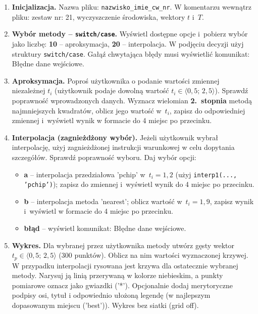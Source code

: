 \documentclass[a4paper,11pt]{article}
\begin{document}
\begin{enumerate}[leftmargin=*, label=\textbf{\arabic*.}, itemsep=2pt]

  \item \textbf{Inicjalizacja.}
    Nazwa pliku: \texttt{nazwisko\_imie\_cw\_nr}. W komentarzu wewnątrz pliku: zestaw nr: 21, wyczyszczenie środowiska, wektory $t$ i~$T$.

  \item \textbf{Wybór metody -- \texttt{switch/case}.}
    Wyświetl dostępne opcje i~pobierz wybór jako liczbę: \textbf{10} -- aproksymacja, \textbf{20} -- interpolacja. W podjęciu decyzji użyj struktury \texttt{switch/case}. Gałąź chwytająca błędy musi wyświetlić komunikat: Błędne dane wejściowe.

  \item \textbf{Aproksymacja.}
    Poproś użytkownika o podanie wartości zmiennej niezależnej $t_i$ (użytkownik podaje dowolną wartość $t_i \in \langle 0{,}5;\,2{,}5 \rangle$). Sprawdź poprawność wprowadzonych danych. Wyznacz wielomian \textbf{2.~stopnia} metodą najmniejszych kwadratów, oblicz jego wartość w~$t_i$, zapisz do odpowiedniej zmiennej i~wyświetl wynik w formacie do 4 miejsc po przecinku.

  \item \textbf{Interpolacja (zagnieżdżony wybór).}
    Jeżeli użytkownik wybrał interpolację, użyj zagnieżdżonej instrukcji warunkowej w celu dopytania szczegółów. Sprawdź poprawność wyboru. Daj wybór opcji:
    \begin{itemize}[itemsep=1pt]
      \item \textbf{a} -- interpolacja przedziałowa 'pchip' w~$t_i = 1{,}2$ (użyj \texttt{interp1(..., 'pchip')}); zapisz do zmiennej i~wyświetl wynik do 4 miejsc po przecinku.
      \item \textbf{b} -- interpolacja metoda 'nearest'; oblicz wartość w~$t_i = 1{,}9$, zapisz wynik i~wyświetl w formacie do 4 miejsc po przecinku.
      \item \textbf{błąd} -- wyświetl komunikat: Błędne dane wejściowe.
    \end{itemize}

  \item \textbf{Wykres.}
    Dla wybranej przez użytkownika metody utwórz gęsty wektor $t_p \in \langle 0{,}5;\,2{,}5 \rangle$ (300 punktów). Oblicz na nim wartości wyznaczonej krzywej. W przypadku interpolacji rysowana jest krzywa dla ostatecznie wybranej metody. Narysuj ją linią przerywaną w kolorze niebieskim, a punkty pomiarowe oznacz jako gwiazdki ('*'). Opcjonalnie dodaj merytoryczne podpisy osi, tytuł i odpowiednio ułożoną legendę (w najlepszym dopasowanym miejscu ('best')). Wykres bez siatki (grid off).

\end{enumerate}
\end{document}
